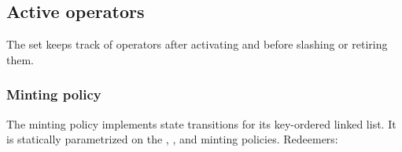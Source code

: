 \documentclass[../midgard.tex]{subfiles}
\begin{document}
\subsection{Active operators}
\label{h:active-operators}

The  set keeps track of operators after activating and before slashing or retiring them.

\subsubsection{Minting policy}
\label{h:active-operators-minting-policy}

The  minting policy implements state transitions for its key-ordered linked list. It is statically parametrized on the , , and  minting policies. Redeemers:
\end{document}
